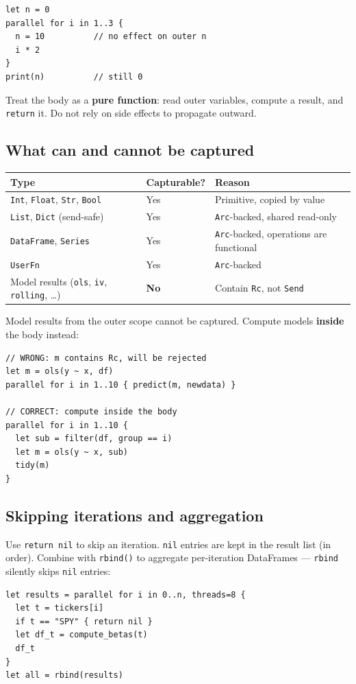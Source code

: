 \begin{lstlisting}[caption={Mutations are discarded}]
let n = 0
parallel for i in 1..3 {
  n = 10          // no effect on outer n
  i * 2
}
print(n)          // still 0
\end{lstlisting}

\begin{aviso}
  Treat the body as a \textbf{pure function}: read outer variables,
  compute a result, and \texttt{return} it. Do not rely on side effects
  to propagate outward.
\end{aviso}

\subsection*{What can and cannot be captured}

\begin{center}
\begin{tabular}{lll}
\toprule
\textbf{Type} & \textbf{Capturable?} & \textbf{Reason} \\
\midrule
\texttt{Int}, \texttt{Float}, \texttt{Str}, \texttt{Bool} & Yes & Primitive, copied by value \\
\texttt{List}, \texttt{Dict} (send-safe) & Yes & \texttt{Arc}-backed, shared read-only \\
\texttt{DataFrame}, \texttt{Series} & Yes & \texttt{Arc}-backed, operations are functional \\
\texttt{UserFn} & Yes & \texttt{Arc}-backed \\
Model results (\texttt{ols}, \texttt{iv}, \texttt{rolling}, \ldots) & \textbf{No} & Contain \texttt{Rc}, not \texttt{Send} \\
\bottomrule
\end{tabular}
\end{center}

Model results from the outer scope cannot be captured. Compute models
\textbf{inside} the body instead:

\begin{lstlisting}[caption={Models must be computed inside}]
// WRONG: m contains Rc, will be rejected
let m = ols(y ~ x, df)
parallel for i in 1..10 { predict(m, newdata) }

// CORRECT: compute inside the body
parallel for i in 1..10 {
  let sub = filter(df, group == i)
  let m = ols(y ~ x, sub)
  tidy(m)
}
\end{lstlisting}

\subsection*{Skipping iterations and aggregation}

Use \texttt{return nil} to skip an iteration. \texttt{nil} entries are
kept in the result list (in order). Combine with \texttt{rbind()} to
aggregate per-iteration DataFrames --- \texttt{rbind} silently skips
\texttt{nil} entries:

\begin{lstlisting}[caption={parallel for + rbind}]
let results = parallel for i in 0..n, threads=8 {
  let t = tickers[i]
  if t == "SPY" { return nil }
  let df_t = compute_betas(t)
  df_t
}
let all = rbind(results)
\end{lstlisting}
